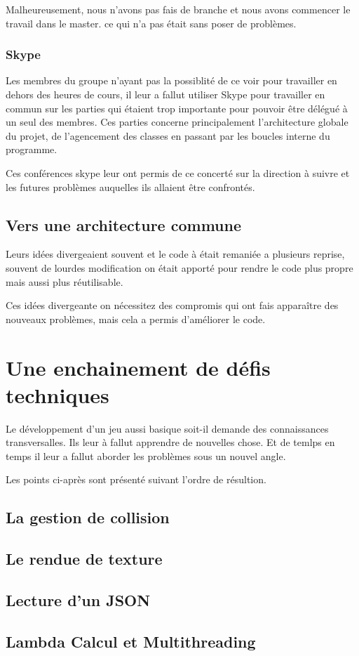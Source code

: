 \documentclass[french,12pt]{article}
\begin{document}
Malheureusement, nous n'avons pas fais de branche et nous avons commencer le travail dans le master. ce qui n'a pas était sans poser de problèmes.

\subsubsection{Skype}

Les membres du groupe n'ayant pas la possiblité de ce voir pour travailler en dehors des heures de cours, il leur a fallut utiliser Skype pour travailler en commun sur les parties qui étaient trop importante pour pouvoir être délégué à un seul des membres. Ces parties concerne principalement l'architecture globale du projet, de l'agencement des classes en passant par les boucles interne du programme.

Ces conférences skype leur ont permis de ce concerté sur la direction à suivre et les futures problèmes auquelles ils allaient être confrontés. 

\subsection{Vers une architecture commune}

Leurs idées divergeaient souvent et le code à était remaniée a plusieurs reprise, souvent de lourdes modification on était apporté pour rendre le code plus propre mais aussi plus réutilisable.

Ces idées divergeante on nécessitez des compromis qui ont fais apparaître des nouveaux problèmes, mais cela a permis d'améliorer le code.

\section{Une enchainement de défis techniques}

Le développement d'un jeu aussi basique soit-il demande des connaissances transversalles. Ils leur à fallut  apprendre de nouvelles chose. Et de temlps en temps il leur a fallut aborder les problèmes sous un  nouvel angle.

Les points ci-après sont présenté suivant l'ordre de résultion.

\subsection{La gestion de collision}

\subsection{Le rendue de texture}

\subsection{Lecture d'un JSON}

\subsection{Lambda Calcul et Multithreading}

\end{document}
